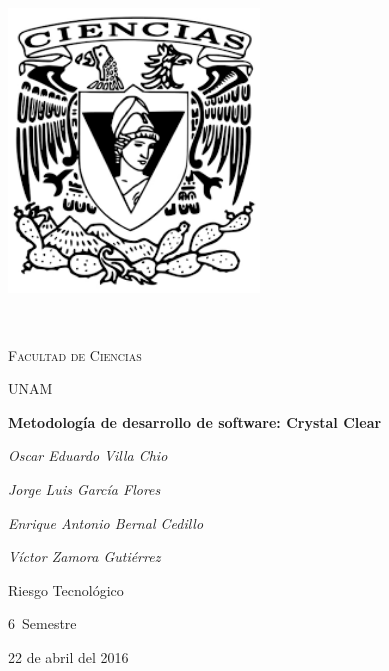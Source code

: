 \documentclass[12pt,a4paper]{report}
\begin{document}
\begin{titlepage}
	\centering
	\includegraphics[width=0.5\textwidth]{./images/logo_ciencias}\par\
	{\scshape\LARGE Facultad de Ciencias \par}
	{\scshape\LARGE UNAM \par}
	\vspace{1cm}
	{\huge\bfseries Metodolog\'ia de desarrollo de software: Crystal Clear\par}
	\vspace{2cm}
	{\Large\itshape Oscar Eduardo Villa Chio\par}
	{\Large\itshape Jorge Luis Garc\'ia Flores\par}
	{\Large\itshape Enrique Antonio Bernal Cedillo\par}
	{\Large\itshape V\'ictor Zamora Guti\'errez\par}
	\vspace{0.5cm}
	{\large Riesgo Tecnol\'ogico\par 6\textdegree \ Semestre}

	{\large 22 de abril del 2016}
\end{titlepage}
\end{document}
